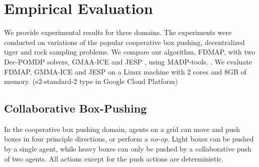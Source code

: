 \documentclass[letterpaper]{article}
\theoremstyle{definition}
\newcommand{\commentout}[1]{}
\newcommand{\cbp}[0]{Collaborative Box-Pushing}
\begin{document}
\commentout{
\begin{algorithm}
\caption{Alignment Iteration}
\begin{algorithmic}[tbph]
\State Input: PolicyGraphs $G_1, \ldots, G_M$
\For{$G_i,  i\in\{1, \ldots, M\}$}
	\State {$\mathit{NoopsReqs} \gets \mathit{VertexToIntMapping}$}
      \State {$\mathit{CurrBFS} \gets \Call{BFS}{G_i}$}
      \While {$\mathit{CurrBFS.queue}$ is not empty}
	\State {$v \gets \mathit{CurrBFS.queue.pop}$}
	\State {$a \gets v.action$}
	\If {$a$ is public action}
	\State {$\mathit{identifier} \gets \Call{GetIdentifier}{v}$}
	\State {$\mathit{MaxNoop} \gets 0$}
	\For {$G_j,  j\in\{1, \ldots, M\}\setminus\{i\}$}
	\State {$\mathit{CurrNoop} \gets \Call{NoopReq}{G_j, \mathit{identifier}}$}
	\State {$\mathit{MaxNoop} \gets max(\mathit{MaxNoop}, \mathit{CurrNoop})$}
	\EndFor
	\State {$\mathit{NoopsReqs}[v] \gets \mathit{MaxNoop} - \mathit{CompensationTerm}$}
	\EndIf
	\EndWhile
	\State {$G_i' \gets \Call{AddNoops}{G_i, \mathit{NoopsReqs}}$}
\EndFor
\State {return $G_1', \ldots, G_M'$}
\end{algorithmic}
\end{algorithm}
}

\section{Empirical Evaluation}

We provide experimental results for three domains.
The experiments were conducted on variations of the popular cooperative box pushing, decentralized tiger and rock sampling problems.
We compare our algorithm, FDMAP, with two Dec-POMDP solvers, GMAA-ICE \cite{GMAAICE} and JESP \cite{JESP}, using MADP-tools. \cite{MADP}.
We evaluate FDMAP, GMMA-ICE and JESP on a Linux machine with 2 cores and 8GB of memory. (e2-standard-2 type in Google Cloud Platform)

\subsection{\cbp}

In the cooperative box pushing domain, agents on a grid can move and push boxes in four principle directions,
or perform a {\em no-op}. Light boxes can be pushed by a single agent, while heavy boxes can only be pushed by a collaborative push of two agents. 
All actions except for the push actions are deterministic.
\end{document}
